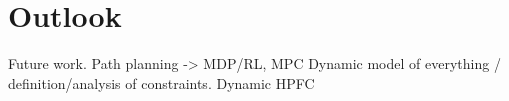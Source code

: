 \chapter{Outlook}\label{outlook}

Future work.
Path planning -> MDP/RL, MPC
Dynamic model of everything / definition/analysis of constraints.
Dynamic HPFC